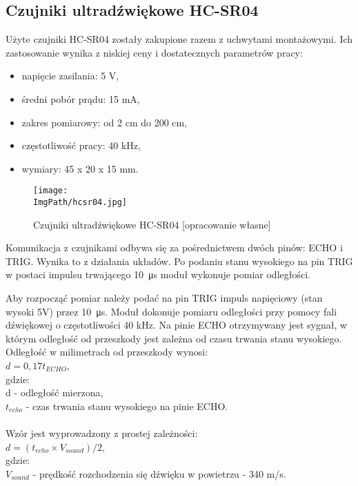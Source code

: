 \documentclass[a4paper,12pt,twoside,openany]{report}
\newcommand{\ImgPath}{.}
\begin{document}
\subsection{Czujniki ultradźwiękowe HC-SR04}

Użyte czujniki HC-SR04 zostały zakupione razem z uchwytami montażowymi. Ich zastosowanie wynika z niskiej ceny i dostatecznych parametrów pracy:
\begin{itemize}
\item napięcie zasilania: 5 V,
\item średni pobór prądu: 15 mA,
\item zakres pomiarowy: od 2 cm do 200 cm,
\item częstotliwość pracy: 40 kHz,
\item wymiary: 45 x 20 x 15 mm.
\end{itemize}

\begin{figure}[!htbp]
	\begin{center}
\centering
\texttt{[image: \\ImgPath/hcsr04.jpg]}
\end{center}
	\caption{Czujniki ultradźwiękowe HC-SR04 [opracowanie własne]}
	\label{schematKomunikacji}
\end{figure}

\newpage

Komunikacja z czujnikami odbywa się za pośrednictwem dwóch pinów: ECHO i TRIG. Wynika to z działania układów. Po podaniu stanu wysokiego na pin TRIG w postaci impulsu trwającego \SI{10}{\micro s} moduł wykonuje pomiar odległości.

Aby rozpocząć pomiar należy podać na pin TRIG impuls napięciowy (stan wysoki 5V) przez \SI{10}{\micro s}. Moduł dokonuje pomiaru odległości przy pomocy fali dźwiękowej o częstotliwości 40 kHz. Na pinie ECHO otrzymywany jest sygnał, w którym odległość od przeszkody jest zależna od czasu trwania stanu wysokiego. Odległość w milimetrach od przeszkody wynosi:\\
$d = 0,17t_{ECHO}$,\\
gdzie:\\
d - odległość mierzona,\\
$t_{echo}$ - czas trwania stanu wysokiego na pinie ECHO.\\
\\
\noindent Wzór jest wyprowadzony z prostej zależności:\\
$d = (t_{echo} × V_{sound})/2$,\\
gdzie:\\
$V_{sound}$ - prędkość rozchodzenia się dźwięku w powietrzu - 340 m/s.
\end{document}
